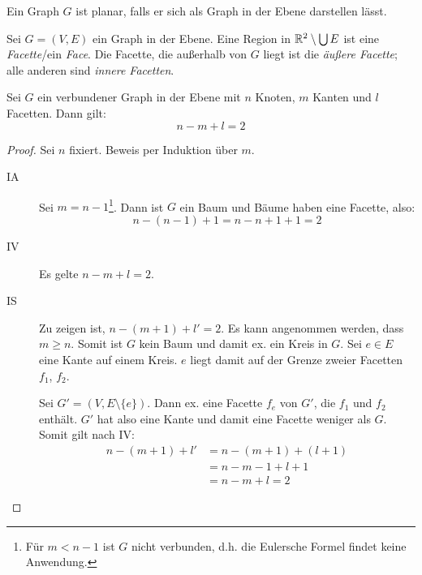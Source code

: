 \begin{definition}[Planar]
    Ein Graph $ G $ ist planar, falls er sich als Graph in der Ebene darstellen lässt.
\end{definition}

\begin{definition}
    Sei $ G = (V, E) $ ein Graph in der Ebene.
    Eine Region in $ \mathbb{R}^2 \setminus \bigcup E $ ist eine \textit{Facette}/ein \textit{Face}.
    Die Facette, die außerhalb von $ G $ liegt ist die \textit{äußere Facette}; alle anderen sind \textit{innere Facetten}.
\end{definition}

\begin{theorem}
    Sei $ G $ ein verbundener Graph in der Ebene mit $ n $ Knoten, $ m $ Kanten und $ l $ Facetten.
    Dann gilt:
    \begin{equation*}
        n - m + l = 2
    \end{equation*}
\end{theorem}

\begin{proof}
    Sei $ n $ fixiert.
    Beweis per Induktion über $ m $.
    \begin{description}
        \item[IA] Sei $ m = n - 1 $\footnote{%
            Für $ m < n - 1 $ ist $ G $ nicht verbunden, d.h. die Eulersche Formel findet keine Anwendung.
        }.
        Dann ist $ G $ ein Baum und Bäume haben eine Facette, also:
        \begin{equation*}
            n - (n - 1) + 1 = n - n + 1 + 1 = 2
        \end{equation*}
        \item[IV] Es gelte $ n - m + l = 2 $.
        \item[IS] Zu zeigen ist, $ n - (m + 1) + l' = 2 $.
        Es kann angenommen werden, dass $ m \geq n $.
        Somit ist $ G $ kein Baum und damit ex. ein Kreis in $ G $.
        Sei $ e \in E $ eine Kante auf einem Kreis.
        $ e $ liegt damit auf der Grenze zweier Facetten $ f_1 $, $ f_2 $.

        Sei $ G' = (V, E \setminus \{ e \}) $.
        Dann ex. eine Facette $ f_e $ von $ G' $, die $ f_1 $ und $ f_2 $ enthält.
        $ G' $ hat also eine Kante und damit eine Facette weniger als $ G $.
        Somit gilt nach IV:
        \begin{align*}
            n - (m + 1) + l' &= n - (m + 1) + (l + 1) \\
            &= n - m - 1 + l + 1 \\
            &= n - m + l = 2
        \end{align*}
    \end{description}
\end{proof}

